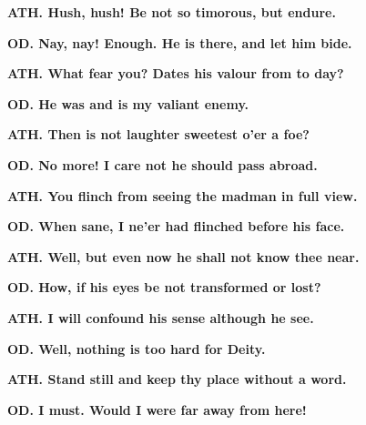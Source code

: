 \documentclass[11pt,letter]{book}
\begin{document}
\par \textbf{ATH. Hush, hush! Be not so timorous, but endure.}
\par 

\par \textbf{OD. Nay, nay! Enough. He is there, and let him bide.}
\par 

\par \textbf{ATH. What fear you? Dates his valour from to day?}
\par 

\par \textbf{OD. He was and is my valiant enemy.}
\par 

\par \textbf{ATH. Then is not laughter sweetest o’er a foe?}
\par 

\par \textbf{OD. No more! I care not he should pass abroad.}
\par 

\par \textbf{ATH. You flinch from seeing the madman in full view.}
\par 

\par \textbf{OD. When sane, I ne’er had flinched before his face.}
\par 

\par \textbf{ATH. Well, but even now he shall not know thee near.}
\par 

\par \textbf{OD. How, if his eyes be not transformed or lost?}
\par 

\par \textbf{ATH. I will confound his sense although he see.}
\par 

\par \textbf{OD. Well, nothing is too hard for Deity.}
\par 

\par \textbf{ATH. Stand still and keep thy place without a word.}
\par 

\par \textbf{OD. I must. Would I were far away from here!}
\par 
\end{document}
